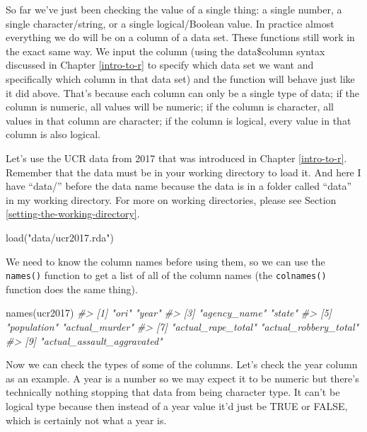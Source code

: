 \documentclass[
]{krantz}
\makeatletter
\newenvironment{Shaded}{\begin{snugshade}}{\end{snugshade}}
\newcommand{\CommentTok}[1]{\textcolor[rgb]{0.37,0.37,0.37}{\textit{#1}}}
\newcommand{\FunctionTok}[1]{\textcolor[rgb]{0,0,0}{#1}}
\newcommand{\NormalTok}[1]{#1}
\newcommand{\StringTok}[1]{\textcolor[rgb]{0.5,0.5,0.5}{#1}}
\newenvironment{kframe}{%
\medskip{}
\setlength{\fboxsep}{.8em}
 \def\at@end@of@kframe{}%
 \ifinner\ifhmode%
  \def\at@end@of@kframe{\end{minipage}}%
  \begin{minipage}{\columnwidth}%
 \fi\fi%
 \def\FrameCommand##1{\hskip\@totalleftmargin \hskip-\fboxsep
 \colorbox{shadecolor}{##1}\hskip-\fboxsep
     \hskip-\linewidth \hskip-\@totalleftmargin \hskip\columnwidth}%
 \MakeFramed {\advance\hsize-\width
   \@totalleftmargin\z@ \linewidth\hsize
   \@setminipage}}%
 {\par\unskip\endMakeFramed%
 \at@end@of@kframe}
\renewenvironment{Shaded}{\begin{kframe}}{\end{kframe}}
\makeatother
\begin{document}
So far we've just been checking the value of a single thing:
a single number, a single character/string, or a single
logical/Boolean value. In practice almost everything we do
will be on a column of a data set. These functions still
work in the exact same way. We input the column (using the
data\$column syntax discussed in Chapter \ref{intro-to-r} to
specify which data set we want and specifically which column
in that data set) and the function will behave just like it
did above. That's because each column can only be a single
type of data; if the column is numeric, all values will be
numeric; if the column is character, all values in that
column are character; if the column is logical, every value
in that column is also logical.

Let's use the UCR data from 2017 that was introduced in
Chapter \ref{intro-to-r}. Remember that the data must be in
your working directory to load it. And here I have ``data/''
before the data name because the data is in a folder called
``data'' in my working directory. For more on working
directories, please see Section
\ref{setting-the-working-directory}.

\begin{Shaded}
\begin{Highlighting}[]
\FunctionTok{load}\NormalTok{(}\StringTok{"data/ucr2017.rda"}\NormalTok{)}
\end{Highlighting}
\end{Shaded}

We need to know the column names before using them, so we
can use the \texttt{names()} function to get a list of all
of the column names (the \texttt{colnames()} function does
the same thing).

\begin{Shaded}
\begin{Highlighting}[]
\FunctionTok{names}\NormalTok{(ucr2017)}
\CommentTok{\#\textgreater{} [1] "ori"                       "year"                     }
\CommentTok{\#\textgreater{} [3] "agency\_name"               "state"                    }
\CommentTok{\#\textgreater{} [5] "population"                "actual\_murder"            }
\CommentTok{\#\textgreater{} [7] "actual\_rape\_total"         "actual\_robbery\_total"     }
\CommentTok{\#\textgreater{} [9] "actual\_assault\_aggravated"}
\end{Highlighting}
\end{Shaded}

Now we can check the types of some of the columns. Let's
check the year column as an example. A year is a number so
we may expect it to be numeric but there's technically
nothing stopping that data from being character type. It
can't be logical type because then instead of a year value
it'd just be TRUE or FALSE, which is certainly not what a
year is.
\end{document}
